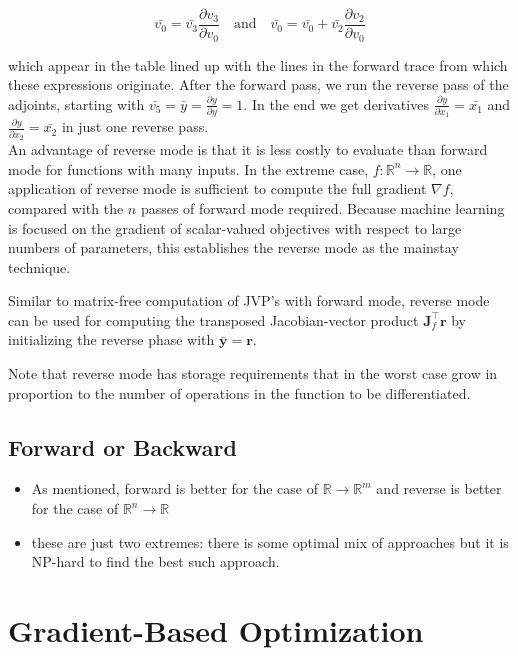 \documentclass[11pt]{article}
\theoremstyle{definition}
\theoremstyle{plain}
\renewcommand{\v}[1]{\mathbf{#1}}
\renewcommand{\b}[1]{\mathbb{#1}}
\begin{document}
$$ \bar{v_0} = \bar{v_3} \frac{\partial v_3}{\partial v_0} \quad \text{and} \quad
   \bar{v_0} = \bar{v_0} + \bar{v_2} \frac{\partial v_2}{\partial v_0} $$

\noindent which appear in the table lined up with the lines in the forward trace
from which these expressions originate. After the forward pass, we run
the reverse pass of the adjoints, starting with $\bar{v_5} = \bar{y} =
\frac{\partial y}{\partial y} = 1$. In the end we get derivatives
$\frac{\partial y}{\partial x_1} = \bar{x_1}$ and $\frac{\partial y}{\partial x_2} =
\bar{x_2}$ in just one reverse pass.\\

\noindent An advantage of reverse mode is that it is less costly to evaluate
than forward mode for functions with many inputs. In the extreme case,
$f: \b{R}^n \rightarrow \b{R}$, one application of reverse mode is sufficient
to compute the full gradient $\nabla f$, compared with the $n$ passes of
forward mode required. Because machine learning is focused on the
gradient of scalar-valued objectives with respect to large numbers of
parameters, this establishes the reverse mode as the mainstay technique.

\noindent Similar to matrix-free computation of JVP's with forward mode, reverse
mode can be used for computing the transposed Jacobian-vector product
$\v{J}_f^\top \v{r}$ by initializing the reverse phase with $\bar{\v{y}}=\v{r}$.

\noindent Note that reverse mode has storage requirements that in the worst case
grow in proportion to the number of operations in the function to be differentiated.

\subsection{Forward or Backward}

\begin{itemize}
    \item As mentioned, forward is better for the case of $\b{R} \rightarrow \b{R}^m$
    and reverse is better for the case of $\b{R}^n \rightarrow \b{R}$
    \item these are just two extremes: there is some optimal mix of approaches
          but it is NP-hard to find the best such approach.
\end{itemize}

\section{Gradient-Based Optimization}
\end{document}

